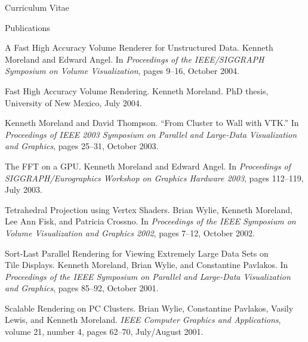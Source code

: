 \documentclass{article}
\begin{document}
\begin{cv}{Curriculum Vitae}
\begin{cvlist}{Publications}
    \item[A Fast High Accuracy Volume Renderer for Unstructured Data.]
      Kenneth Moreland and Edward Angel.  In \emph{Proceedings of the
        IEEE/SIGGRAPH Symposium on Volume Visualization}, pages 9--16,
      October 2004.
    \item[Fast High Accuracy Volume Rendering.] Kenneth Moreland.  PhD
      thesis, University of New Mexico, July 2004.
    \item Kenneth Moreland and David Thompson.  ``From Cluster to Wall
      with VTK.''  In \emph{Proceedings of IEEE 2003 Symposium on
      Parallel and Large-Data Visualization and Graphics}, pages 25--31,
      October 2003.
    \item[The FFT on a GPU.] Kenneth Moreland and Edward Angel.  In
      \emph{Proceedings of SIGGRAPH/Eurographics Workshop on Graphics
        Hardware 2003}, pages 112--119, July 2003.
    \item[Tetrahedral Projection using Vertex Shaders.] Brian Wylie,
      Kenneth Moreland, Lee Ann Fisk, and Patricia Crossno.  In
      \emph{Proceedings of the IEEE Symposium on Volume Visualization and
        Graphics 2002}, pages 7--12, October 2002.
    \item[Sort-Last Parallel Rendering for Viewing Extremely Large Data
      Sets on]~\\ Tile Displays. Kenneth Moreland, Brian Wylie, and
      Constantine Pavlakos.  In \emph{Proceedings of the IEEE Symposium on
        Parallel and Large-Data Visualization and Graphics}, pages 85--92,
      October 2001.
    \item[Scalable Rendering on PC Clusters.] Brian Wylie, Constantine
      Pavlakos, Vasily Lewis, and Kenneth Moreland.  \emph{IEEE Computer
        Graphics and Applications}, volume 21, number 4, pages 62--70,
      July/August 2001.
    \end{cvlist}


\end{cv}
\end{document}

